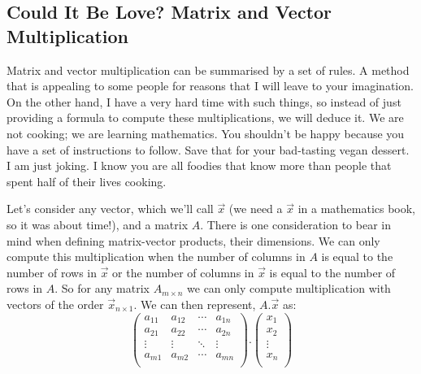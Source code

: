 \documentclass[600paper, 11pt,twoside,openany]{kdp}
\begin{document}
\subsection{Could It Be Love? Matrix and Vector Multiplication}
\par 
\vspace{-3pt}
\indent Matrix and vector multiplication can be summarised by a set of rules. A method that is appealing to some people for reasons that I will leave to your imagination. On the other hand, I have a very hard time with such things, so instead of just providing a formula to compute these multiplications, we will deduce it. We are not cooking; we are learning mathematics. You shouldn’t be happy because you have a set of instructions to follow. Save that for your bad-tasting vegan dessert. I am just joking. I know you are all foodies that know more than people that spent half of their lives cooking.
\par 
\vspace{-3pt}
\indent Let’s consider any vector, which we’ll call $\overrightarrow{x}$ (we need a  $\overrightarrow{x}$ in a mathematics book, so it was about time!), and a matrix $A$. There is one consideration to bear in mind when defining matrix-vector products, their dimensions. We can only compute this multiplication when the number of columns in $A$ is equal to the number of rows in $\overrightarrow{x}$ or the number of columns in $\overrightarrow{x}$ is equal to the number of rows in $A$. So for any matrix $A_{m \times n}$ we can only compute multiplication with vectors of the order $\overrightarrow{x}_{n \times 1}$. We can then represent, $A.\overrightarrow{x}$ as:
\begin{equation} \label{eq:multi}
\begin{pmatrix}
a_{11} & a_{12} & \cdots & a_{1n}\\
a_{21} & a_{22} & \cdots & a_{2n}\\
\vdots & \vdots & \ddots & \vdots\\
a_{m1} & a_{m2} & \cdots & a_{mn}\\
\end{pmatrix}. \begin{pmatrix}
x_{1} \\
x_{2} \\
\vdots \\
x_{n} \\
\end{pmatrix}
\end{equation}
\par 
\vspace{-3pt}
\end{document}
